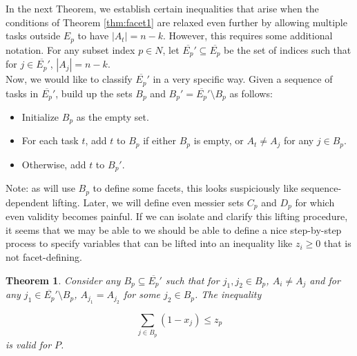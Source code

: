 \documentclass[12pt]{article}
\newcommand{\lp}{\left(}
\newcommand{\rp}{\right)}
\renewcommand{\v}[1]{\overline{#1}}
\newcommand{\sm}{\setminus}
\newtheorem{thm}{Theorem}
\begin{document}
In the next Theorem, we establish certain inequalities that arise when the conditions of Theorem \ref{thm:facet1} are relaxed even further by allowing multiple tasks outside $E_p$ to have $|A_t| = n-k$. However, this requires some additional notation. For any subset index $p \in N$, let $\v{E_p}' \subseteq \v{E_p}$ be the set of indices such that for $j \in \v{E_p}'$, $|A_j| = n-k$.\\

Now, we would like to classify $\v{E_p}'$ in a very specific way. Given a sequence of tasks in $\v{E_p}'$, build up the sets $B_p$ and $B_p' = \v{E_p}' \setminus B_p$ as follows:

\begin{itemize}
\item Initialize $B_p$ as the empty set.
\item For each task $t$, add $t$ to $B_p$ if either $B_p$ is empty, or $A_t \neq A_j$ for any $j \in B_p$.
\item Otherwise, add $t$ to $B_p'$.
\end{itemize}

Note: as will use $B_p$ to define some facets, this looks suspiciously like sequence-dependent lifting. Later, we will define even messier sets $C_p$ and $D_p$ for which even validity becomes painful. If we can isolate and clarify this lifting procedure, it seems that we may be able to
we should be able to define a nice step-by-step process to specify variables that can be lifted into an inequality like $z_i \geq 0$ that is not facet-defining.

\begin{thm} \label{thm:vi1valid}
Consider any $B_p \subseteq \v{E_p}'$ such that for ${j_1},{j_2} \in B_p$, $A_i \neq A_j$ and for any $j_1 \in \v{E_p}' \sm B_p$, $A_{j_1} = A_{j_2}$ for some $j_2 \in B_p$. The inequality

\begin{equation} \label{eq:vi1}
\sum_{j \in B_p} \lp 1 - x_j \rp \leq z_p
\end{equation}
is valid for $P$.
\end{thm}
\end{document}
